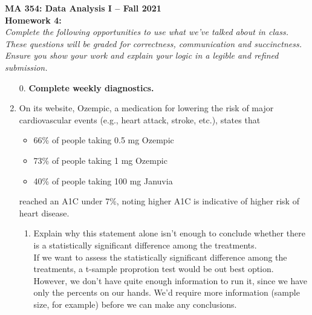\documentclass{article}\usepackage[]{graphicx}\usepackage[]{color}
\begin{document}
\noindent \textbf{MA 354: Data Analysis I -- Fall 2021}\\%
\noindent \textbf{Homework 4:}\vspace{1em}\\
\emph{Complete the following opportunities to use what we've talked about in class. 
These questions will be graded for correctness, communication and succinctness. 
Ensure you show your work and explain your logic in a legible and refined submission.}
\begin{enumerate}
\item[0.] \textbf{Complete weekly diagnostics.}
  
\item On its website, Ozempic, a medication for lowering the risk of major cardiovascular 
events (e.g., heart attack, stroke, etc.), states that 
\begin{itemize}
  \item 66\% of people taking 0.5 mg Ozempic
  \item 73\% of people taking 1 mg Ozempic
  \item 40\% of people taking 100 mg Januvia
\end{itemize}
reached an A1C under 7\%, noting higher A1C is indicative of higher risk of heart disease.

\begin{enumerate}
\item Explain why this statement alone isn't enough to conclude whether there is a statistically 
significant difference among the treatments.\\

If we want to assess the statistically significant difference among the treatments, a t-sample proprotion test would be out best option. However, we don't have quite enough information to run it, since we have only the percents on our hands. We'd require more information (sample size, for example) before we can make any conclusions.


\end{enumerate}
\end{enumerate}
\end{document}
